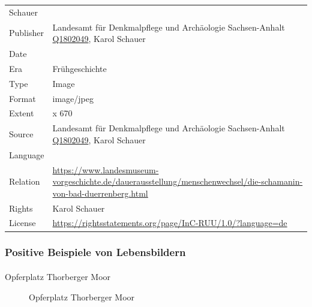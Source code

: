 \documentclass[
  letterpaper,
  DIV=11,
  numbers=noendperiod]{scrartcl}
\makeatletter
\let\oldparagraph\paragraph
\renewcommand{\paragraph}{
    \@ifstar
      \xxxParagraphStar
      \xxxParagraphNoStar
  }
\newcommand{\xxxParagraphStar}[1]{\oldparagraph*{#1}\mbox{}}
\newcommand{\xxxParagraphNoStar}[1]{\oldparagraph{#1}\mbox{}}
\makeatother
\begin{document}
\begin{longtable}[]{@{}
  >{\raggedright\arraybackslash}p{}
  >{\raggedright\arraybackslash}p{}@{}}
Schauer \\
Publisher & Landesamt für Denkmalpflege und Archäologie Sachsen-Anhalt
\href{https://www.wikidata.org/wiki/Q1802049}{Q1802049}, Karol
Schauer \\
Date & \\
Era & Frühgeschichte \\
Type & Image \\
Format & image/jpeg \\
Extent & 551 x 670 \\
Source & Landesamt für Denkmalpflege und Archäologie Sachsen-Anhalt
\href{https://www.wikidata.org/wiki/Q1802049}{Q1802049}, Karol
Schauer \\
Language & \\
Relation &
\url{https://www.landesmuseum-vorgeschichte.de/dauerausstellung/menschenwechsel/die-schamanin-von-bad-duerrenberg.html} \\
Rights & Karol Schauer \\
License &
\url{https://rightsstatements.org/page/InC-RUU/1.0/?language=de} \\
\end{longtable}

\subsubsection{Positive Beispiele von
Lebensbildern}\label{positive-beispiele-von-lebensbildern}

\paragraph{Opferplatz Thorberger Moor}\label{opferplatz-thorberger-moor}

\begin{figure}


\caption{\label{fig-opferplatz-thorberger-moor}Opferplatz Thorberger
Moor}

\end{figure}%
\end{document}

